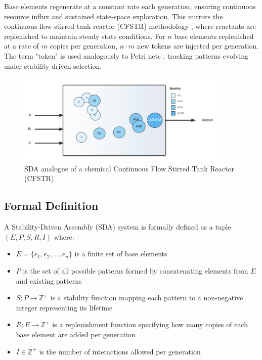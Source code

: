 \documentclass[preprint,12pt]{elsarticle}
\begin{document}
Base elements regenerate at a constant rate each generation, ensuring continuous resource influx and sustained state-space exploration. This mirrors the continuous-flow stirred tank reactor (CFSTR) methodology \cite{fogler1999chemical}, where reactants are replenished to maintain steady state conditions. For \( n \) base elements replenished at a rate of \( m \) copies per generation, \( n \cdot m \) new tokens are injected per generation. The term "token" is used analogously to Petri nets \cite{petri1962communication}, tracking patterns evolving under stability-driven selection.

\begin{figure}[htp]
    \centering
    \includegraphics[width=0.9\textwidth]{figure_1}
    \caption{SDA analogue of a chemical Continuous Flow Stirred Tank Reactor (CFSTR)}
    \label{fig:figure_1}
\end{figure}

\subsection{Formal Definition}

A Stability-Driven Assembly (SDA) system is formally defined as a tuple $(E, P, S, R, I)$ where:
\begin{itemize}
   \item $E = \{e_1, e_2, \ldots, e_n\}$ is a finite set of base elements
   \item $P$ is the set of all possible patterns formed by concatenating elements from $E$ and existing patterns
   \item $S: P \rightarrow \mathbb{Z}^{+}$ is a stability function mapping each pattern to a non-negative integer representing its lifetime
   \item $R: E \rightarrow \mathbb{Z}^{+}$ is a replenishment function specifying how many copies of each base element are added per generation
   \item $I \in \mathbb{Z}^{+}$ is the number of interactions allowed per generation
\end{itemize}
\end{document}
